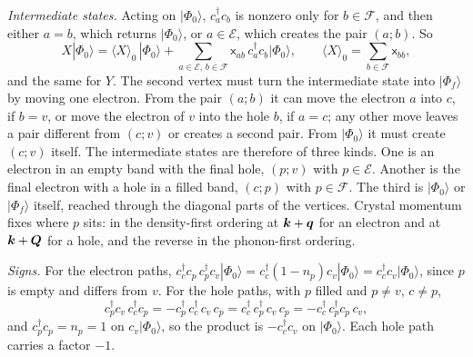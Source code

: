 \emph{Intermediate states.} Acting on $|\Phi_0\rangle$, $c^\dagger_ac_b$ is nonzero only for $b\in\mathcal{F}$, and then either $a = b$, which returns $|\Phi_0\rangle$, or $a\in\mathcal{E}$, which creates the pair $(a;b)$. So
\begin{equation*}
  X|\Phi_0\rangle = \langle X\rangle_0\,|\Phi_0\rangle + \sum_{a\in\mathcal{E},\,b\in\mathcal{F}}\mathsf{x}_{ab}\,c^\dagger_ac_b|\Phi_0\rangle , \qquad \langle X\rangle_0 = \sum_{b\in\mathcal{F}}\mathsf{x}_{bb} ,
\end{equation*}
and the same for $Y$. The second vertex must turn the intermediate state into $|\Phi_f\rangle$ by moving one electron. From the pair $(a;b)$ it can move the electron $a$ into $c$, if $b = v$, or move the electron of $v$ into the hole $b$, if $a = c$; any other move leaves a pair different from $(c;v)$ or creates a second pair. From $|\Phi_0\rangle$ it must create $(c;v)$ itself. The intermediate states are therefore of three kinds. One is an electron in an empty band with the final hole, $(p;v)$ with $p\in\mathcal{E}$. Another is the final electron with a hole in a filled band, $(c;p)$ with $p\in\mathcal{F}$. The third is $|\Phi_0\rangle$ or $|\Phi_f\rangle$ itself, reached through the diagonal parts of the vertices. Crystal momentum fixes where $p$ sits: in the density-first ordering at $\bm{k}+\bm{q}$ for an electron and at $\bm{k}+\bm{Q}$ for a hole, and the reverse in the phonon-first ordering.

\emph{Signs.} For the electron paths, $c^\dagger_cc_p\,c^\dagger_pc_v|\Phi_0\rangle = c^\dagger_c(1 - n_p)c_v|\Phi_0\rangle = c^\dagger_cc_v|\Phi_0\rangle$, since $p$ is empty and differs from $v$. For the hole paths, with $p$ filled and $p \neq v$, $c\neq p$,
\begin{equation*}
  c^\dagger_pc_v\,c^\dagger_cc_p = -c^\dagger_p\,c^\dagger_c\,c_v\,c_p = c^\dagger_c\,c^\dagger_p\,c_v\,c_p = -c^\dagger_c\,c^\dagger_pc_p\,c_v ,
\end{equation*}
and $c^\dagger_pc_p = n_p = 1$ on $c_v|\Phi_0\rangle$, so the product is $-c^\dagger_cc_v$ on $|\Phi_0\rangle$. Each hole path carries a factor $-1$.

